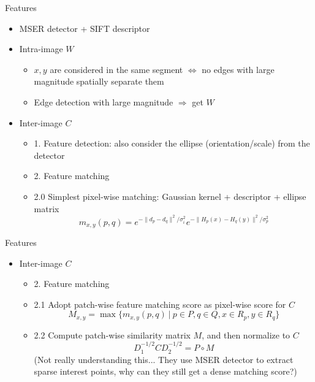 \documentclass[12pt]{beamer}
\begin{document}
\begin{frame}{Features}
    \begin{itemize}
        \item MSER detector + SIFT descriptor
        \item Intra-image $W$
        \begin{itemize}
            \item $x, y$ are considered in the same segment $\Leftrightarrow$ no edges with large magnitude spatially separate them
            \item Edge detection with large magnitude $\Rightarrow$ get $W$
        \end{itemize}
        \item Inter-image $C$
        \begin{itemize}
            \item 1. Feature detection: also consider the ellipse (orientation/scale) from the detector
            \item 2. Feature matching
            \item 2.0 Simplest pixel-wise matching: Gaussian kernel + descriptor + ellipse matrix
            \[m_{x, y}(p, q) = e^{-\lVert d_p - d_q \rVert^2/\sigma_i^2}e^{-\lVert H_p(x)-H_q(y)\rVert^2/\sigma_p^2}\]
        \end{itemize}
    \end{itemize}
\end{frame}

\begin{frame}{Features}
    \begin{itemize}
        \item Inter-image $C$
        \begin{itemize}
            \item 2. Feature matching
            \item 2.1 Adopt patch-wise feature matching score as pixel-wise score for $C$
            \[M_{x, y} = \max\{m_{x, y}(p, q) \ | \ p\in P, q \in Q, x \in R_p, y \in R_q\}\]
            \item 2.2 Compute patch-wise similarity matrix $M$, and then normalize to $C$
            \[D^{-1/2}_1CD^{-1/2}_2 = P \circ M\]
            (Not really understanding this... They use MSER detector to extract sparse interest points, why can they still get a dense matching score?)
        \end{itemize}
    \end{itemize}
\end{frame}
\end{document}
